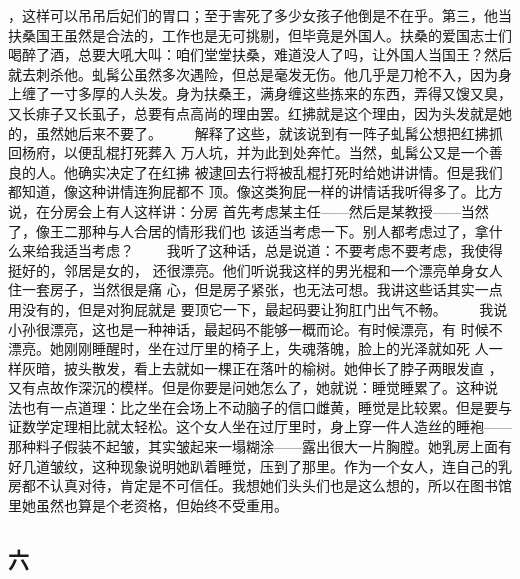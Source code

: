 ，这样可以吊吊后妃们的胃口；至于害死了多少女孩子他倒是不在乎。第三，他当 扶桑国王虽然是合法的，工作也是无可挑剔，但毕竟是外国人。扶桑的爱国志士们 喝醉了酒，总要大吼大叫：咱们堂堂扶桑，难道没人了吗，让外国人当国王？然后 就去刺杀他。虬髯公虽然多次遇险，但总是毫发无伤。他几乎是刀枪不入，因为身 上缠了一寸多厚的人头发。身为扶桑王，满身缠这些拣来的东西，弄得又馊又臭， 又长痱子又长虱子，总要有点高尚的理由罢。红拂就是这个理由，因为头发就是她 的，虽然她后来不要了。 　　解释了这些，就该说到有一阵子虬髯公想把红拂抓回杨府，以便乱棍打死葬入 万人坑，并为此到处奔忙。当然，虬髯公又是一个善良的人。他确实决定了在红拂 被逮回去行将被乱棍打死时给她讲讲情。但是我们都知道，像这种讲情连狗屁都不 顶。像这类狗屁一样的讲情话我听得多了。比方说，在分房会上有人这样讲：分房 首先考虑某主任——然后是某教授——当然了，像王二那种与人合居的情形我们也 该适当考虑一下。别人都考虑过了，拿什么来给我适当考虑？ 　　我听了这种话，总是说道：不要考虑不要考虑，我使得挺好的，邻居是女的， 还很漂亮。他们听说我这样的男光棍和一个漂亮单身女人住一套房子，当然很是痛 心，但是房子紧张，也无法可想。我讲这些话其实一点用没有的，但是对狗屁就是 要顶它一下，最起码要让狗肛门出气不畅。 　　我说小孙很漂亮，这也是一种神话，最起码不能够一概而论。有时候漂亮，有 时候不漂亮。她刚刚睡醒时，坐在过厅里的椅子上，失魂落魄，脸上的光泽就如死 人一样灰暗，披头散发，看上去就如一棵正在落叶的榆树。她伸长了脖子两眼发直 ，又有点故作深沉的模样。但是你要是问她怎么了，她就说：睡觉睡累了。这种说 法也有一点道理：比之坐在会场上不动脑子的信口雌黄，睡觉是比较累。但是要与 证数学定理相比就太轻松。这个女人坐在过厅里时，身上穿一件人造丝的睡袍—— 那种料子假装不起皱，其实皱起来一塌糊涂——露出很大一片胸膛。她乳房上面有 好几道皱纹，这种现象说明她趴着睡觉，压到了那里。作为一个女人，连自己的乳 房都不认真对待，肯定是不可信任。我想她们头头们也是这么想的，所以在图书馆 里她虽然也算是个老资格，但始终不受重用。 
 
 
\subsection{六} 
 
